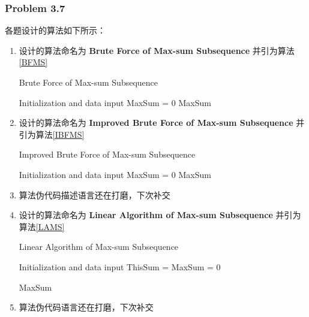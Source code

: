 \documentclass[UTF8,12pt]{article} %
\makeatletter
\theoremstyle{definition}
\newenvironment{proof}[1][\protect\proofname]{\par
\normalfont\topsep6\p@\@plus6\p@\relax
\trivlist
\itemindent\parindent
\item[\hskip\labelsep
\scshape
#1]\ignorespaces
}{%
\endtrivlist\@endpefalse
}
\renewcommand{\proofname}{\it{\textbf{证明}}}
\makeatother
\begin{document}
\subsubsection*{Problem 3.7}
\begin{proof}[\textbf{解答}]
各题设计的算法如下所示：
\begin{enumerate}[1)]
\item 
设计的算法命名为 \textbf{Brute Force of Max-sum Subsequence} 并引为算法\ref{BFMS}

		\begin{algorithm}[htb]
	    \caption{Brute Force of Max-sum Subsequence}
	    \label{BFMS}

		\SetAlgoLined
		Initialization and data input\;
		MaxSum = 0\;
		\Return MaxSum\;
		\end{algorithm}
\item
设计的算法命名为 \textbf{Improved Brute Force of Max-sum Subsequence} 并引为算法\ref{IBFMS}

		\begin{algorithm}[htb]
	    \caption{Improved Brute Force of Max-sum Subsequence}
	    \label{IBFMS}

		\SetAlgoLined
		Initialization and data input\;
		MaxSum = 0\;
		\Return MaxSum\;
		\end{algorithm}

\item 算法伪代码描述语言还在打磨，下次补交

\item 
设计的算法命名为 \textbf{Linear Algorithm of Max-sum Subsequence} 并引为算法\ref{LAMS}

		\begin{algorithm}[htb]
	    \caption{Linear Algorithm of Max-sum Subsequence}
	    \label{LAMS}

		\SetAlgoLined
		Initialization and data input\;
		ThisSum = MaxSum = 0\;
			
		
		\Return MaxSum\;
		\end{algorithm}
\item 算法伪代码语言还在打磨，下次补交
\end{enumerate}
\end{proof}
\end{document}
